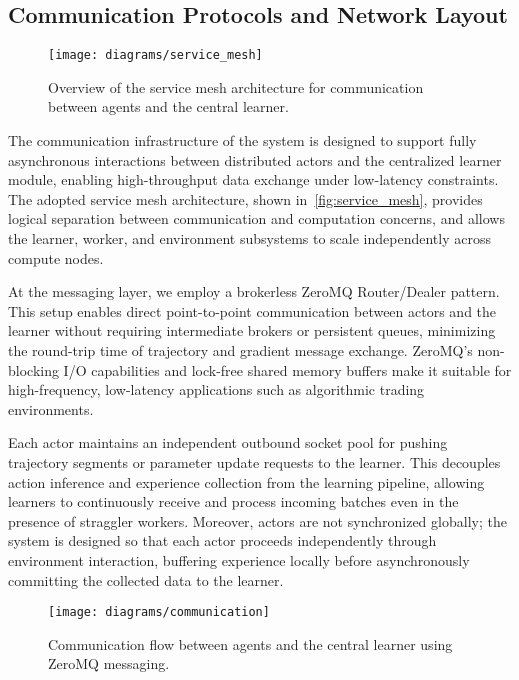 \documentclass[11pt]{article}
\begin{document}
    \subsection{Communication Protocols and Network Layout}
    \label{subsec:communication}

    \begin{figure}[htb]
        \centering
        \texttt{[image: diagrams/service\_mesh]}
        \caption{Overview of the service mesh architecture for communication between agents and the central learner.}
        \label{fig:service_mesh}
    \end{figure}

    The communication infrastructure of the system is designed to support fully asynchronous interactions between distributed actors and the centralized learner module,
    enabling high-throughput data exchange under low-latency constraints.
    The adopted service mesh architecture, shown in~\autoref{fig:service_mesh}, provides logical separation between communication and computation concerns,
    and allows the learner, worker, and environment subsystems to scale independently across compute nodes.

    At the messaging layer, we employ a brokerless ZeroMQ Router/Dealer pattern.
    This setup enables direct point-to-point communication between actors and the learner without requiring intermediate brokers or persistent queues,
    minimizing the round-trip time of trajectory and gradient message exchange.
    ZeroMQ's non-blocking I/O capabilities and lock-free shared memory buffers make it suitable for high-frequency,
    low-latency applications such as algorithmic trading environments.

    Each actor maintains an independent outbound socket pool for pushing trajectory segments or parameter update requests to the learner.
    This decouples action inference and experience collection from the learning pipeline,
    allowing learners to continuously receive and process incoming batches even in the presence of straggler workers.
    Moreover, actors are not synchronized globally; the system is designed so that each actor proceeds independently through environment interaction,
    buffering experience locally before asynchronously committing the collected data to the learner.

    \begin{figure}[htb]
        \centering
        \texttt{[image: diagrams/communication]}
        \caption{Communication flow between agents and the central learner using ZeroMQ messaging.}
        \label{fig:communication}
    \end{figure}
\end{document}
